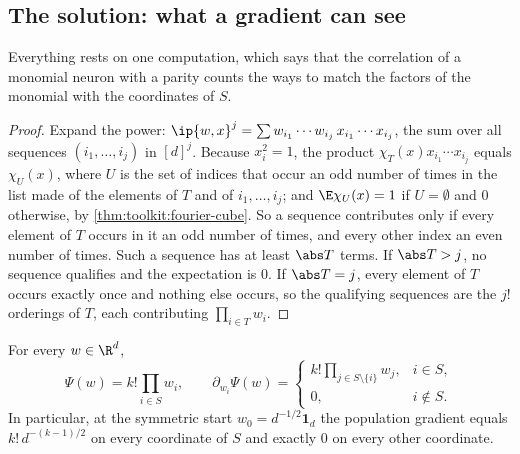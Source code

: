 \begin{refsection}
\section{The solution: what a gradient can see}\label{sec:parity:signal}

Everything rests on one computation, which says that the correlation of a monomial neuron with a parity counts the ways to match the factors of the monomial with the coordinates of $S$.


\begin{proof}
Expand the power: $\ip{w,x}^j=\sum w_{i_1}\cdots w_{i_j}\,x_{i_1}\cdots x_{i_j}$, the sum over all sequences $(i_1,\dots,i_j)$ in $[d]^j$. Because $x_i^2=1$, the product $\chi_T(x)x_{i_1}\cdots x_{i_j}$ equals $\chi_U(x)$, where $U$ is the set of indices that occur an odd number of times in the list made of the elements of $T$ and of $i_1,\dots,i_j$; and $\E\chi_U(x)=1$ if $U=\emptyset$ and $0$ otherwise, by \cref{thm:toolkit:fourier-cube}. So a sequence contributes only if every element of $T$ occurs in it an odd number of times, and every other index an even number of times. Such a sequence has at least $\abs T$ terms. If $\abs T>j$, no sequence qualifies and the expectation is $0$. If $\abs T=j$, every element of $T$ occurs exactly once and nothing else occurs, so the qualifying sequences are the $j!$ orderings of $T$, each contributing $\prod_{i\in T}w_i$.
\end{proof}

\begin{theorem}\label{thm:parity:signal}
For every $w\in\R^d$,
\[
  \Psi(w)=k!\prod_{i\in S}w_i,\qquad \partial_{w_i}\Psi(w)=\begin{cases}k!\prod_{j\in S\setminus\{i\}}w_j,&i\in S,\\0,&i\notin S.\end{cases}
\]
In particular, at the symmetric start $w_0=d^{-1/2}\mathbf 1_d$ the population gradient equals $k!\,d^{-(k-1)/2}$ on every coordinate of $S$ and exactly $0$ on every other coordinate.
\end{theorem}


\end{refsection}
